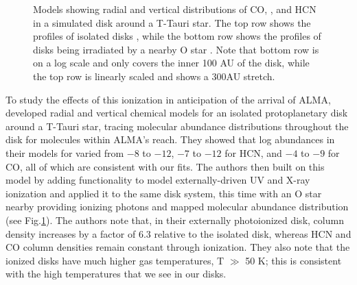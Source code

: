 \begin{figure}[t]
  \hspace*{\fill}%
  \vfill%
  \hspace*{\fill}%
  \caption{Models showing radial and vertical distributions of CO, \hco, and HCN in a simulated disk around a T-Tauri star. The top row shows the profiles of isolated disks \citep{Walsh2010}, while the bottom row shows the profiles of disks being irradiated by a nearby O star \citep{Walsh2013}. Note that bottom row is on a log scale and only covers the inner 100 AU of the disk, while the top row is linearly scaled and shows a 300AU stretch.}
  \label{fig:walsh-abundance-profs}
\end{figure}




To study the effects of this ionization in anticipation of the arrival of ALMA, \citet{Walsh2010} developed radial and vertical chemical models for an isolated protoplanetary disk around a T-Tauri star, tracing molecular abundance distributions throughout the disk for molecules within ALMA's reach. They showed that log abundances in their models for \hco varied from $-8$ to $-12$, $-7$ to $-12$ for HCN, and $-4$ to $-9$ for CO, all of which are consistent with our fits. The authors then built on this model by adding functionality to model externally-driven UV and X-ray ionization \citep{Walsh2012} and applied it to the same disk system, this time with an O star nearby providing ionizing photons \citep{Walsh2013} and mapped molecular abundance distribution (see Fig.\ref{fig:walsh-abundance-profs}). The authors note that, in their externally photoionized disk, \hco column density increases by a factor of 6.3 relative to the isolated disk, whereas HCN and CO column densities remain constant through ionization. They also note that the ionized disks have much higher gas temperatures, T $\gg$ 50 K; this is consistent with the high temperatures that we see in our disks.


